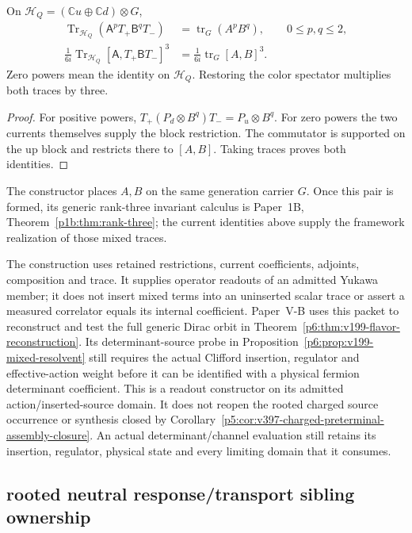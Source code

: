 \documentclass[12pt,a4paper]{article}
\begin{document}
\begin{theorem}
\label{p5:thm:v199-weak-current-moments}
On \(\mathcal H_Q=(\mathbb C u\oplus\mathbb C d)\otimes G\),
\begin{align}
 \operatorname{Tr}_{\mathcal H_Q}
 (\mathsf A^pT_+\mathsf B^qT_-)&=\operatorname{tr}_G(A^pB^q),
 \qquad 0\le p,q\le2,\label{p5:eq:v199-current-moment}\\
 \frac1{6i}\operatorname{Tr}_{\mathcal H_Q}
 [\mathsf A,T_+\mathsf BT_-]^3
 &=\frac1{6i}\operatorname{tr}_G[A,B]^3.
 \label{p5:eq:v199-current-cp}
\end{align}
Zero powers mean the identity on \(\mathcal H_Q\).  Restoring the color
spectator multiplies both traces by three.
\end{theorem}
\begin{proof}
For positive powers, \(T_+(P_d\otimes B^q)T_-=P_u\otimes B^q\).
For zero powers the two currents themselves supply the block restriction.
The commutator is supported on the up block and restricts there to \([A,B]\).
Taking traces proves both identities.
\end{proof}
The constructor places $A,B$ on the same generation carrier $G$.
Once this pair is formed, its generic rank-three invariant calculus is
Paper~1B, Theorem~\ref{p1b:thm:rank-three}; the current identities above
supply the framework realization of those mixed traces.


The construction uses retained restrictions, current coefficients, adjoints,
composition and trace.  It supplies operator readouts of an admitted Yukawa
member; it does not insert mixed terms into an uninserted scalar trace or
assert a measured correlator equals its internal coefficient.  Paper~V-B
uses this packet to reconstruct and test the full generic Dirac orbit in
Theorem~\ref{p6:thm:v199-flavor-reconstruction}.  Its determinant-source
probe in Proposition~\ref{p6:prop:v199-mixed-resolvent} still requires the
actual Clifford insertion, regulator and effective-action weight before it
can be identified with a physical fermion determinant coefficient.
This is a readout constructor on its admitted action/inserted-source
domain. It does not reopen the rooted charged source occurrence or synthesis
closed by Corollary~\ref{p5:cor:v397-charged-preterminal-assembly-closure}.
An actual determinant/channel evaluation still retains its insertion,
regulator, physical state and every limiting domain that it consumes.


\subsection{rooted neutral response/transport sibling ownership}
\label{p5:sec:v3100-neutral-response-transport-sibling}
\end{document}
